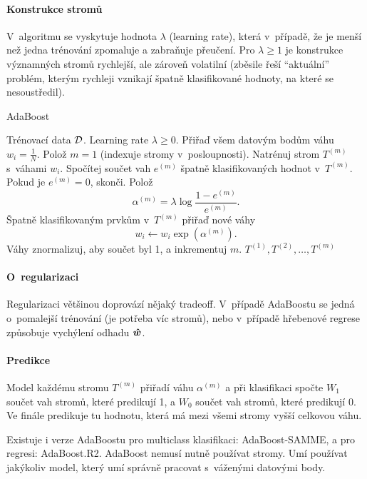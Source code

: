 \paragraph{Konstrukce stromů}

V~algoritmu se vyskytuje hodnota $\lambda$ (learning rate), která v~případě, že je menší než jedna trénování zpomaluje a zabraňuje přeučení. Pro $\lambda \ge 1$ je konstrukce významných stromů rychlejší, ale zároveň volatilní (zběsile řeší ``aktuální'' problém, kterým rychleji vznikají špatně klasifikované hodnoty, na které se nesoustředil).

\begin{algorithm}[H]
    \renewcommand{\thealgorithm}{}
    \caption{AdaBoost}
    \begin{algorithmic}[1]
        \Require
        \Statex Trénovací data $\mathcal{D}$.
        \Statex Learning rate $\lambda \ge 0$.
        \Statex
        \State Přiřaď všem datovým bodům váhu $w_i = \frac{1}{N}$.
        \State Polož $m = 1$ (indexuje stromy v~posloupnosti).
        \State Natrénuj strom $T^{(m)}$ s~váhami $w_i$.
        \State Spočítej součet vah $e^{(m)}$ špatně klasifikovaných hodnot v~$T^{(m)}$.
        \State Pokud je $e^{(m)} = 0$, skonči.
        \State Polož \[\alpha^{(m)} = \lambda \log\frac{1 - e^{(m)}}{e^{(m)}}.\]
        \State Špatně klasifikovaným prvkům v~$T^{(m)}$ přiřaď nové váhy
        \[w_i \leftarrow w_i \exp(\alpha^{(m)}).\]
        \State Váhy znormalizuj, aby součet byl 1, a inkrementuj $m$.
        \EndWhile
        \State \Return $T^{(1)}, T^{(2)}, \ldots, T^{(m)}$
    \end{algorithmic}
\end{algorithm}

\paragraph{O~regularizaci}

Regularizaci většinou doprovází nějaký tradeoff. V~případě AdaBoostu se jedná o~pomalejší trénování (je potřeba víc stromů), nebo v~případě hřebenové regrese způsobuje vychýlení odhadu $\bm{\hat{w}}$.

\paragraph{Predikce}

Model každému stromu $T^{(m)}$ přiřadí váhu $\alpha^{(m)}$ a při klasifikaci spočte $W_1$ součet vah stromů, které predikují 1, a $W_0$ součet vah stromů, které predikují 0. Ve finále predikuje tu hodnotu, která má mezi všemi stromy vyšší celkovou váhu.

Existuje i verze AdaBoostu pro multiclass klasifikaci: AdaBoost-SAMME, a pro regresi: AdaBoost.R2. AdaBoost nemusí nutně používat stromy. Umí používat jakýkoliv model, který umí správně pracovat s~váženými datovými body.
